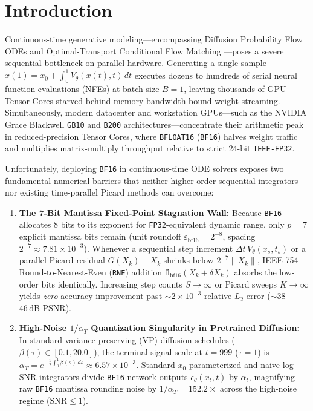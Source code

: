 \documentclass[11pt,a4paper]{article}
\theoremstyle{definition}
\theoremstyle{remark}
\newcommand{\bfsixteen}{\texttt{BF16}}
\newcommand{\fpthirtytwo}{\texttt{FP32}}
\newcommand{\epsbf}{\varepsilon_{\mathrm{bf16}}}
\begin{document}
\section{Introduction}
\label{sec:intro}
Continuous-time generative modeling---encompassing Diffusion Probability Flow ODEs \citep{ho2020denoising,song2021denoising,song2021scorebased,karras2022elucidating} and Optimal-Transport Conditional Flow Matching \citep{lipman2023flow,tong2024improving}---poses a severe sequential bottleneck on parallel hardware. Generating a single sample $x(1) = x_0 + \int_0^1 V_\theta(x(t), t)\,dt$ executes dozens to hundreds of serial neural function evaluations (NFEs) at batch size $B=1$, leaving thousands of GPU Tensor Cores starved behind memory-bandwidth-bound weight streaming. Simultaneously, modern datacenter and workstation GPUs---such as the NVIDIA Grace Blackwell \texttt{GB10} and \texttt{B200} architectures---concentrate their arithmetic peak in reduced-precision Tensor Cores, where \texttt{BFLOAT16} (\bfsixteen{}) \citep{kalamkar2019study} halves weight traffic and multiplies matrix-multiply throughput relative to strict $24$-bit \texttt{IEEE-FP32}.

Unfortunately, deploying \bfsixteen{} in continuous-time ODE solvers exposes two fundamental numerical barriers that neither higher-order sequential integrators \citep{lu2022dpmsolver,zhao2023unipc} nor existing time-parallel Picard methods \citep{shih2023parallel,tang2024accelerating} can overcome:
\begin{enumerate}[leftmargin=1.8em,itemsep=2pt]
    \item \textbf{The 7-Bit Mantissa Fixed-Point Stagnation Wall:} Because \bfsixteen{} allocates $8$ bits to its exponent for \fpthirtytwo{}-equivalent dynamic range, only $p=7$ explicit mantissa bits remain (unit roundoff $\epsbf = 2^{-8}$, spacing $2^{-7} \approx 7.81 \times 10^{-3}$). Whenever a sequential step increment $\Delta t \, V_\theta(x_s, t_s)$ or a parallel Picard residual $G(X_k) - X_k$ shrinks below $2^{-7}\|X_k\|$, IEEE-754 Round-to-Nearest-Even (\texttt{RNE}) addition $\mathrm{fl}_{\mathrm{bf16}}(X_k + \delta X_k)$ absorbs the low-order bits identically. Increasing step counts $S \to \infty$ or Picard sweeps $K \to \infty$ yields \emph{zero} accuracy improvement past $\sim 2 \times 10^{-3}$ relative $L_2$ error ($\sim 38$--$46\,\mathrm{dB}$ PSNR).
    \item \textbf{High-Noise $1/\alpha_T$ Quantization Singularity in Pretrained Diffusion:} In standard variance-preserving (VP) diffusion schedules ($\beta(\tau) \in [0.1, 20.0]$), the terminal signal scale at $t=999$ ($\tau=1$) is $\alpha_T = e^{-\frac{1}{2}\int_0^1 \beta(s)\,ds} \approx 6.57 \times 10^{-3}$. Standard $x_0$-parameterized and naive log-SNR integrators divide \bfsixteen{} network outputs $\epsilon_\theta(x_t, t)$ by $\alpha_t$, magnifying raw \bfsixteen{} mantissa rounding noise by $1/\alpha_T = \mathbf{152.2\times}$ across the high-noise regime ($\mathrm{SNR} \le 1$).
\end{enumerate}
\end{document}
